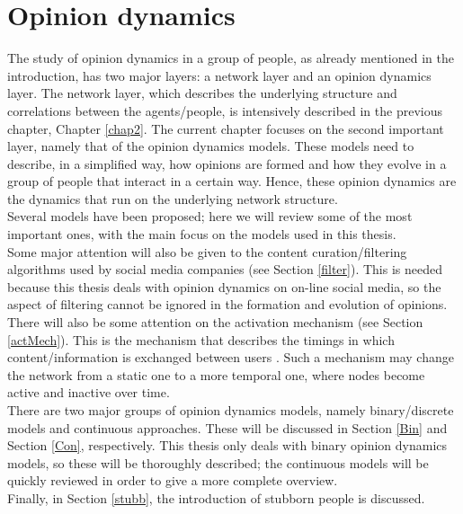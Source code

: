 \documentclass[11 pt , letterpaper , twoside , openright]{book}
\begin{document}
\chapter{Opinion dynamics}
\label{chap3}
The study of opinion dynamics in a group of people, as already mentioned in the introduction, has two major layers: a network layer and an opinion dynamics layer. The network layer, which describes the underlying structure and correlations between the agents/people, is intensively described in the previous chapter, Chapter \ref{chap2}. The current chapter focuses on the second important layer, namely that of the opinion dynamics models. These models need to describe, in a simplified way, how opinions are formed and how they evolve in a group of people that interact in a certain way. Hence, these opinion dynamics are the dynamics that run on the underlying network structure.\\
Several models have been proposed; here we will review some of the most important ones, with the main focus on the models used in this thesis.\\
\newline
Some major attention will also be given to the content curation/filtering algorithms used by social media companies (see Section \ref{filter}). This is needed because this thesis deals with opinion dynamics on on-line social media, so the aspect of filtering cannot be ignored in the formation and evolution of opinions.\\
\newline
There will also be some attention on the activation mechanism (see Section \ref{actMech}). This is the mechanism that describes the timings in which content/information is exchanged between users \cite{Perra2019}. Such a mechanism may change the network from a static one to a more temporal one, where nodes become active and inactive over time. \\
\newline
There are two major groups of opinion dynamics models, namely binary/discrete models and continuous approaches. These will be discussed in Section \ref{Bin} and Section \ref{Con}, respectively. This thesis only deals with binary opinion dynamics models, so these will be thoroughly described; the continuous models will be quickly reviewed in order to give a more complete overview.\\
\newline
Finally, in Section \ref{stubb}, the introduction of stubborn people is discussed.
\end{document}
